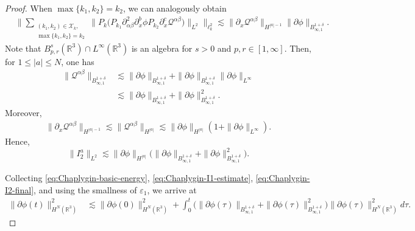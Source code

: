 \documentclass[11pt,twoside]{article}
\def\cQ{\mathcal Q}
\def\ls{\lesssim}
\theoremstyle{plain}
\theoremstyle{definition}
\theoremstyle{assumption}
\numberwithin{equation}{section}
\begin{document}
\begin{proof}
		When $\max\{k_1,k_2\}=k_2$, we can analogously obtain
		\begin{equation}\label{eq:Chaplygin-I2-second-frequency-case}
			\begin{aligned}
				&
				\big\|
				\sum_{\substack{(k_1,k_2)\in\mathcal X_k,\\
				\max\{k_1,k_2\}=k_2}}
				\big\|
				P_k
				\big(
				P_{k_1}\partial_{\alpha\beta}^2\partial_x^b\phi
				P_{k_2}\partial_x^c\cQ^{\alpha\beta}
				\big)
				\big\|_{L^2}
				\big\|_{\ell_k^2}
				\ls
				\|\partial_x\cQ^{\alpha\beta}\|_{H^{|a|-1}}
				\|\partial\phi\|_{B_{\infty,1}^{1+\delta}}.
			\end{aligned}
		\end{equation}
		Note that
		$B_{p,r}^s(\mathbb R^3)\cap L^\infty(\mathbb R^3)$ is an algebra for
		$s>0$ and $p,r\in[1,\infty]$. Then, for $1\le |a|\le N$, one has
		\begin{equation}\label{eq:Chaplygin-Q-Besov}
			\begin{aligned}
				\|\cQ^{\alpha\beta}\|_{B_{\infty,1}^{1+\delta}}
				&\ls
				\|\partial\phi\|_{B_{\infty,1}^{1+\delta}}
				+
				\|\partial\phi\|_{B_{\infty,1}^{1+\delta}}
				\|\partial\phi\|_{L^\infty}
				\\
				&\ls
				\|\partial\phi\|_{B_{\infty,1}^{1+\delta}}
				+
				\|\partial\phi\|_{B_{\infty,1}^{1+\delta}}^2.
			\end{aligned}
		\end{equation}
		Moreover,
		\begin{equation}\label{eq:Chaplygin-Q-high-Sobolev}
			\begin{aligned}
				\|\partial_x\cQ^{\alpha\beta}\|_{H^{|a|-1}}
				\ls
				\|\cQ^{\alpha\beta}\|_{H^{|a|}}
				\ls
				\|\partial\phi\|_{H^{|a|}}
				\left(
				1+
				\|\partial\phi\|_{L^\infty}
				\right).
			\end{aligned}
		\end{equation}
		Hence,
		\begin{equation}\label{eq:Chaplygin-I2-final}
			\|I_2^a\|_{L^2}
			\ls
			\|\partial\phi\|_{H^{|a|}}
			\big(
			\|\partial\phi\|_{B_{\infty,1}^{1+\delta}}
			+
			\|\partial\phi\|_{B_{\infty,1}^{1+\delta}}^2
			\big).
		\end{equation}
	
		
		Collecting \eqref{eq:Chaplygin-basic-energy},
		\eqref{eq:Chaplygin-I1-estimate},
		\eqref{eq:Chaplygin-I2-final}, and using the smallness of
		$\varepsilon_1$, we arrive at
		\begin{equation}\label{eq:Chaplygin-energy-integral}
			\begin{aligned}
				\|\partial\phi(t)\|_{H^N(\mathbb R^3)}^2
				&\ls
				\|\partial\phi(0)\|_{H^N(\mathbb R^3)}^2
				+\int_0^t
				\big(
				\|\partial\phi(\tau)\|_{B_{\infty,1}^{1+\delta}}
				+\|\partial\phi(\tau)\|_{B_{\infty,1}^{1+\delta}}^2
				\big)
				\|\partial\phi(\tau)\|_{H^N(\mathbb R^3)}^2
				d\tau.
			\end{aligned}
		\end{equation}
		

\end{proof}
\end{document}
